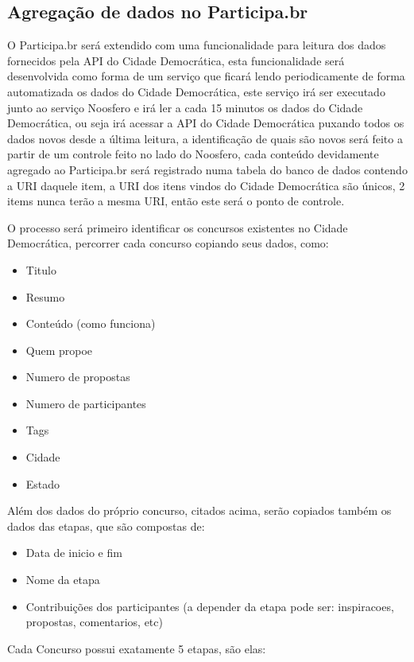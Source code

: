 \documentclass[12pt]{article}
\begin{document}
\subsection{Agregação de dados no Participa.br}

O Participa.br será extendido com uma funcionalidade para leitura dos dados
fornecidos pela API do Cidade Democrática, esta funcionalidade será
desenvolvida como forma de um serviço que ficará lendo periodicamente de forma
automatizada os dados do Cidade Democrática, este serviço irá ser executado
junto ao serviço Noosfero e irá ler a cada 15 minutos os dados do Cidade
Democrática, ou seja irá acessar a API do Cidade Democrática puxando todos os
dados novos desde a última leitura, a identificação de quais são novos será
feito a partir de um controle feito no lado do Noosfero, cada conteúdo
devidamente agregado ao Participa.br será registrado numa tabela do banco de
dados contendo a URI daquele item, a URI dos itens vindos do Cidade
Democrática são únicos, 2 items nunca terão a mesma URI, então este será o
ponto de controle.

O processo será primeiro identificar os concursos existentes no Cidade
Democrática, percorrer cada concurso copiando seus dados, como:

\begin{itemize}
  \item Titulo
  \item Resumo
  \item Conteúdo (como funciona)
  \item Quem propoe
  \item Numero de propostas
  \item Numero de participantes
  \item Tags
  \item Cidade
  \item Estado
\end{itemize}

Além dos dados do próprio concurso, citados acima, serão copiados também os
dados das etapas, que são compostas de:

\begin{itemize}
  \item Data de inicio e fim
  \item Nome da etapa
  \item Contribuições dos participantes (a depender da etapa pode ser: inspiracoes, propostas, comentarios, etc)
\end{itemize}

Cada Concurso possui exatamente 5 etapas, são elas:
\end{document}
